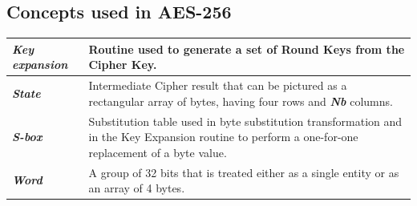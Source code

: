 \documentclass[a4paper, 10pt]{article}
\begin{document}
\begin{multicols}{2}
            \subsection{Concepts used in AES-256}
                    \noindent
			\begin{center}
                    \begin{tabular}{m{2cm} m{5.5cm}}
                        \textbf{\textit{Key expansion}} & Routine used to generate a set of Round Keys from the Cipher Key.\\
                        \hline
                        \textbf{\textit{State}} & Intermediate Cipher result that can be pictured as a rectangular array of bytes, having four rows and \textbf{\textit{Nb}} columns.\\
                        \hline
                        \textbf{\textit{S-box}} & Substitution table used in byte substitution transformation and in the Key Expansion routine to perform a one-for-one replacement of a byte value.\\
                        \hline
                        \textbf{\textit{Word}} & A group of 32 bits that is treated either as a single entity or as an array of 4 bytes.\\
                    \end{tabular}
			\end{center}
            

\end{multicols}
\end{document}
